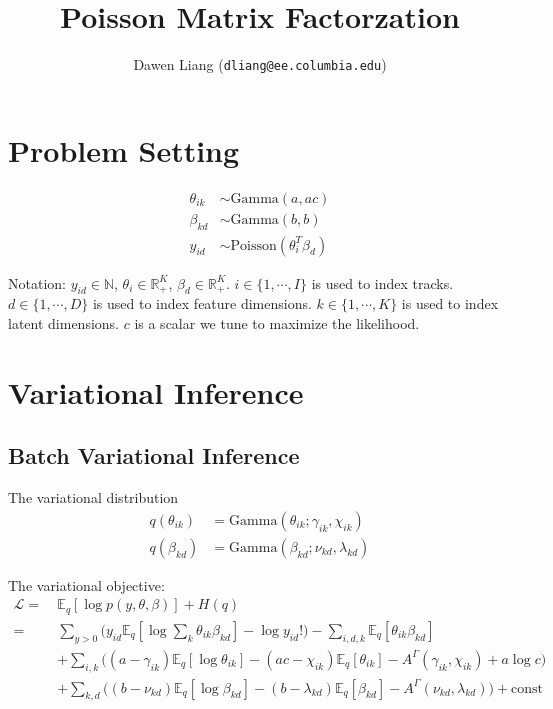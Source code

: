 \documentclass[10pt]{article} %
\title{Poisson Matrix Factorzation}
\author{
Dawen Liang (\texttt{dliang@ee.columbia.edu})
}\date{}                                           %
\begin{document}
\maketitle

\section{Problem Setting}\label{sec:1} 
\begin{equation} \label{eq:model}
\begin{split}
\theta_{ik} &\sim \text{Gamma}(a, ac)\\
\beta_{kd} &\sim \text{Gamma}(b, b)\\
y_{id} &\sim \text{Poisson}( \theta_i^T \beta_d)
\end{split}
\end{equation}

Notation: $y_{id} \in \mathbb{N}$, $\theta_i \in \mathbb{R}_{+}^{K}$, $\beta_d \in \mathbb{R}_{+}^{K}$. $i \in \{1, \cdots, I\}$ is used to index tracks. $d \in \{1, \cdots, D\}$ is used to index feature dimensions. $k \in \{1, \cdots, K\}$ is used to index latent dimensions. $c$ is a scalar we tune to maximize the likelihood. 


\section{Variational Inference}

\subsection{Batch Variational Inference}
The variational distribution
\begin{align*}
q(\theta_{ik}) &= \text{Gamma}(\theta_{ik}; \gamma_{ik}, \chi_{ik})\\
q(\beta_{kd}) &= \text{Gamma}(\beta_{kd}; \nu_{kd},  \lambda_{kd})
\end{align*}

The variational objective:
\begin{align*}
\mathcal{L} =~& \mathbb{E}_q[\log p(y, \theta, \beta)] + H(q)\\
=~&  \sum_{y > 0} \Big( y_{id} \mathbb{E}_q[\log\sum_k \theta_{ik} \beta_{kd}] - \log y_{id}! \Big) - \sum_{i, d, k} \mathbb{E}_q[\theta_{ik} \beta_{kd}] \\
& + \sum_{i, k}\Big( (a - \gamma_{ik}) \mathbb{E}_q [\log \theta_{ik}] - (ac - \chi_{ik}) \mathbb{E}_q[ \theta_{ik}] - A^{\Gamma}(\gamma_{ik}, \chi_{ik}) + a \log c \Big)\\
& + \sum_{k, d}\Big( (b - \nu_{kd}) \mathbb{E}_q [\log \beta_{kd}] - (b - \lambda_{kd}) \mathbb{E}_q[\beta_{kd}] - A^{\Gamma}(\nu_{kd}, \lambda_{kd}) \Big) + \text{const}
\end{align*}
\end{document}
